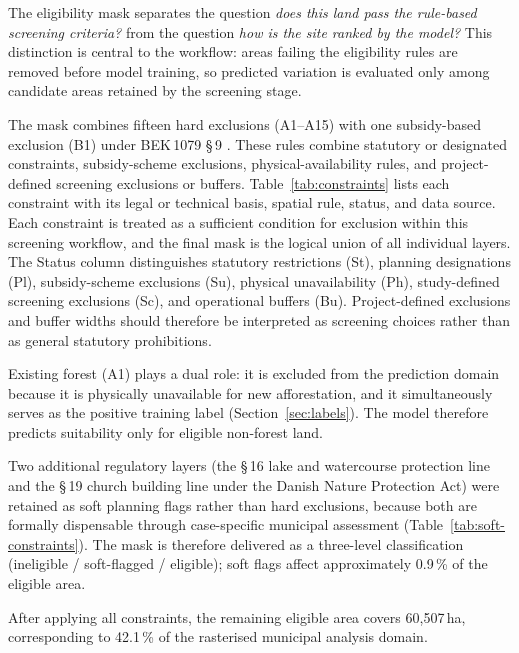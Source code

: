 \documentclass[land,article,submit,moreauthors]{Definitions/mdpi}
\begin{document}
The eligibility mask separates the question \textit{does this land pass the rule-based screening criteria?} from the question \textit{how is the site ranked by the model?} This distinction is central to the workflow: areas failing the eligibility rules are removed before model training, so predicted variation is evaluated only among candidate areas retained by the screening stage.

The mask combines fifteen hard exclusions (A1--A15) with one subsidy-based exclusion (B1) under BEK\,1079 \S\,9 \citep{bek1079_2025}. These rules combine statutory or designated constraints, subsidy-scheme exclusions, physical-availability rules, and project-defined screening exclusions or buffers. Table~\ref{tab:constraints} lists each constraint with its legal or technical basis, spatial rule, status, and data source. Each constraint is treated as a sufficient condition for exclusion within this screening workflow, and the final mask is the logical union of all individual layers. The Status column distinguishes statutory restrictions (St), planning designations (Pl), subsidy-scheme exclusions (Su), physical unavailability (Ph), study-defined screening exclusions (Sc), and operational buffers (Bu). Project-defined exclusions and buffer widths should therefore be interpreted as screening choices rather than as general statutory prohibitions.

Existing forest (A1) plays a dual role: it is excluded from the prediction domain because it is physically unavailable for new afforestation, and it simultaneously serves as the positive training label (Section~\ref{sec:labels}). The model therefore predicts suitability only for eligible non-forest land.

Two additional regulatory layers (the \S\,16 lake and watercourse protection line and the \S\,19 church building line under the Danish Nature Protection Act) were retained as soft planning flags rather than hard exclusions, because both are formally dispensable through case-specific municipal assessment (Table~\ref{tab:soft-constraints}). The mask is therefore delivered as a three-level classification (ineligible / soft-flagged / eligible); soft flags affect approximately 0.9\,\% of the eligible area.

After applying all constraints, the remaining eligible area covers 60{,}507\,ha, corresponding to 42.1\,\% of the rasterised municipal analysis domain.
\end{document}
